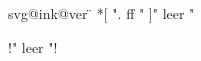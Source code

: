 \documentclass[ngerman]{scrartcl}
\begin{document}
\edef\bla{\csname svg@ink@ver\endcsname}
\meaning\bla
\makeatletter
\@makeother\"




\def\bla{"  leer  "}
\svg@quotes@remove*[ ". ff " ]{\bla}
\par!\meaning\bla!


\meaning\svg@file@ext

%
%
\end{document}
